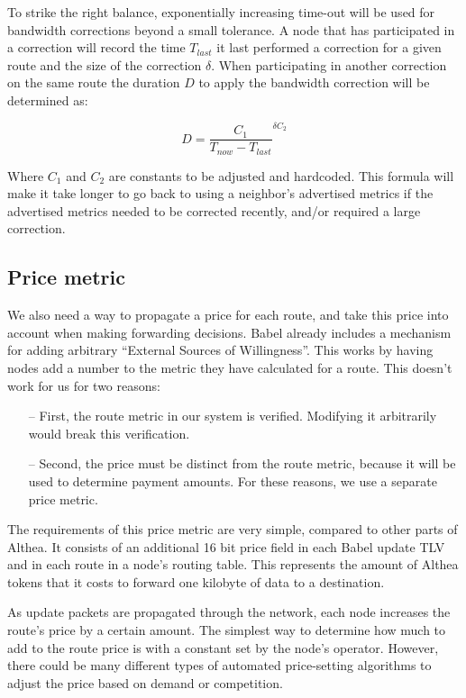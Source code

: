\documentclass[11pt]{article}
\newlength{\currentparskip}
\newenvironment{unbreakable}
  {\setlength{\currentparskip}{\parskip}%
	 \vspace{\currentparskip}
   \begin{minipage}{\textwidth}%
   \setlength{\parskip}{\currentparskip}%
  }
  {\end{minipage}\vspace{\currentparskip}}
\begin{document}
\begin{unbreakable}
To strike the right balance, exponentially increasing time-out will be used for bandwidth corrections beyond a small tolerance. A node that has participated in a correction will record the time $T_{last}$ it last performed a correction for a given route and the size of the correction $\delta$. When participating in another correction on the same route the duration $D$ to apply the bandwidth correction will be determined as:

\[
D = \frac{C_1}{T_{now} - T_{last}}^{\delta C_2}
\]

Where $C_1$ and $C_2$ are constants to be adjusted and hardcoded. This formula will make it take longer to go back to using a neighbor’s advertised metrics if the advertised metrics needed to be corrected recently, and/or required a large correction.
\end{unbreakable}

\subsection{Price metric}
\begin{unbreakable}
We also need a way to propagate a price for each route, and take this price into account when making forwarding decisions. Babel already includes a mechanism for adding arbitrary ``External Sources of Willingness''. This works by having nodes add a number to the metric they have calculated for a route. This doesn’t work for us for two reasons: 
\begin{itemize}
\item[--] First, the route metric in our system is verified. Modifying it arbitrarily would break this verification.
\item[--] Second, the price must be distinct from the route metric, because it will be used to determine payment amounts. For these reasons, we use a separate price metric.
\end{itemize}
\end{unbreakable}

The requirements of this price metric are very simple, compared to other parts of Althea. It consists of an additional 16 bit price field in each Babel update TLV and in each route in a node’s routing table. This represents the amount of Althea tokens that it costs to forward one kilobyte of data to a destination.

As update packets are propagated through the network, each node increases the route’s price by a certain amount. The simplest way to determine how much to add to the route price is with a constant set by the node’s operator. However, there could be many different types of automated price-setting algorithms to adjust the price based on demand or competition.
\end{document}
